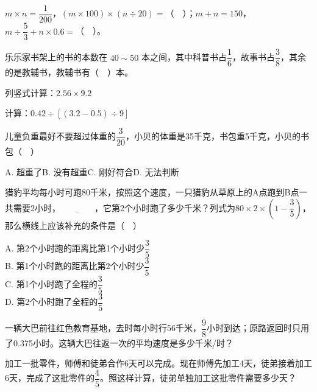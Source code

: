 \vspace{5cm}
\begin{mistake}
$m\times n=\dfrac{1}{200}$，$(m\times100)\times(n\div20)=$（$\quad$）；$m+n=150$，$m\div\dfrac{5}{3}+n\times0.6=$（$\quad$）。
\end{mistake}

\vspace{5cm}
\begin{mistake}
乐乐家书架上的书的本数在 $40\sim50$ 本之间，其中科普书占$\dfrac{1}{6}$，故事书占$\dfrac{3}{8}$，其余的是教辅书，教辅书有（$\quad$）本。
\end{mistake}

\vspace{5cm}
\begin{mistake}
列竖式计算：$2.56\times 9.2$
\end{mistake}

\vspace{5cm}
\begin{mistake}
计算：$0.42\div[(3.2-0.5)\div 9]$
\end{mistake}

\vspace{5cm}
\begin{mistake}
儿童负重最好不要超过体重的$\dfrac{3}{20}$，小贝的体重是35千克，书包重5千克，小贝的书包（$\quad$）

A. 超重了\quad B. 没有超重\quad C. 刚好符合\quad D. 无法判断
\end{mistake}

\vspace{5cm}
\begin{mistake}
猎豹平均每小时可跑80千米，按照这个速度，一只猎豹从草原上的A点跑到B点一共需要2小时，$\underline{\qquad\qquad}$，它第2个小时跑了多少千米？列式为$80\times2\times\left(1-\dfrac{3}{5}\right)$，那么横线上应该补充的条件是（$\quad$）

A. 第2个小时跑的距离比第1个小时少$\dfrac{3}{5}$\\
B. 第1个小时跑的距离比第2个小时少$\dfrac{3}{5}$\\
C. 第1个小时跑了全程的$\dfrac{3}{5}$\\
D. 第2个小时跑了全程的$\dfrac{3}{5}$
\end{mistake}

\vspace{5cm}
\begin{mistake}
一辆大巴前往红色教育基地，去时每小时行56千米，$\dfrac{9}{8}$小时到达；原路返回时只用了0.375小时。这辆大巴往返一次的平均速度是多少千米/时？
\end{mistake}

\vspace{5cm}
\begin{mistake}
加工一批零件，师傅和徒弟合作6天可以完成。现在师傅先加工4天，徒弟接着加工6天，完成了这批零件的$\dfrac{4}{5}$。照这样计算，徒弟单独加工这批零件需要多少天？
\end{mistake}

